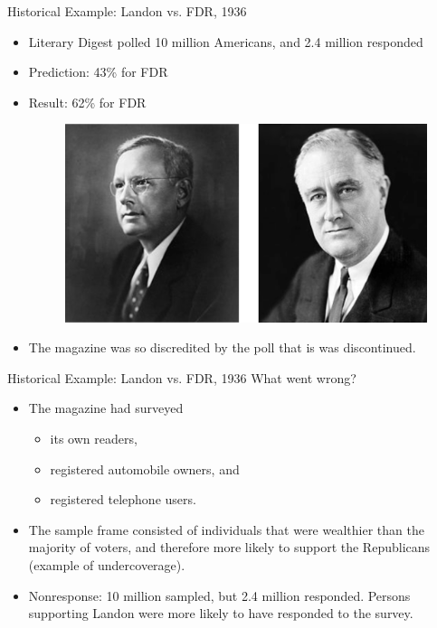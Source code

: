 \documentclass{beamer}
\begin{document}
\begin{frame}{Historical Example: Landon vs. FDR, 1936}
\begin{itemize}
\item Literary Digest polled 10 million Americans, and 2.4 million responded
\item Prediction: 43\% for FDR
\item Result: 62\% for FDR
\begin{figure}
\includegraphics[scale=0.2]{figure/landon-fdr.png}
\end{figure}
\item The magazine was so discredited by the poll that is was discontinued.
\end{itemize}
\end{frame}

\begin{frame}{Historical Example: Landon vs. FDR, 1936}
What went wrong?
\vspace{10pt}
\begin{itemize}
\item The magazine had surveyed
\begin{itemize}
\item its own readers,
\item registered automobile owners, and
\item registered telephone users.
\end{itemize}
\vspace{5pt}
\item The sample frame consisted of individuals that were wealthier than the majority of voters, and therefore more likely to support the Republicans (example of undercoverage).  
\vspace{5pt}
\item Nonresponse: 10 million sampled, but 2.4 million responded.  Persons supporting Landon were more likely to have responded to the survey.    
\end{itemize}
\end{frame}
\end{document}
